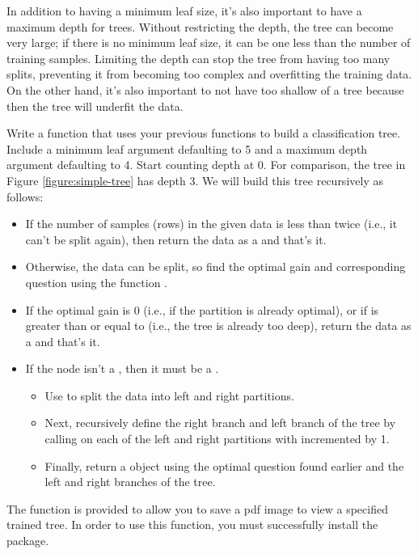 In addition to having a minimum leaf size, it's also important to have a maximum depth for trees.
Without restricting the depth, the tree can become very large; if there is no minimum leaf size, it can be one less than the number of training samples.
Limiting the depth can stop the tree from having too many splits, preventing it from becoming too complex and overfitting the training data.
On the other hand, it's also important to not have too shallow of a tree because then the tree will underfit the data.

\begin{problem}
Write a function  that uses your previous functions to build a classification tree.
Include a minimum leaf argument defaulting to 5 and a maximum depth argument defaulting to 4.
Start counting depth at 0.
For comparison, the tree in Figure \ref{figure:simple-tree} has depth 3.
We will build this tree recursively as follows:

\begin{itemize}
\item If the number of samples (rows) in the given data is less than twice  (i.e., it can't be split again), then return the data as a  and that's it.
\item
Otherwise, the data can be split, so find the optimal gain and corresponding question using the function .
\item
If the optimal gain is 0 (i.e., if the partition is already optimal), or if  is greater than or equal to  (i.e., the tree is already too deep), return the data as a  and that's it.

\item
If the node isn't a , then it must be a .
\begin{itemize}
\item Use  to split the data into left and right partitions.
\item Next, recursively define the right branch and left branch of the tree by calling  on each of the left and right partitions with  incremented by 1.
\item Finally, return a  object using the optimal question found earlier and the left and right branches of the tree.
\end{itemize}
\end{itemize}

The function  is provided to allow you to save a pdf image to view a specified trained tree.
In order to use this function, you must successfully install the  package.


\end{problem}
